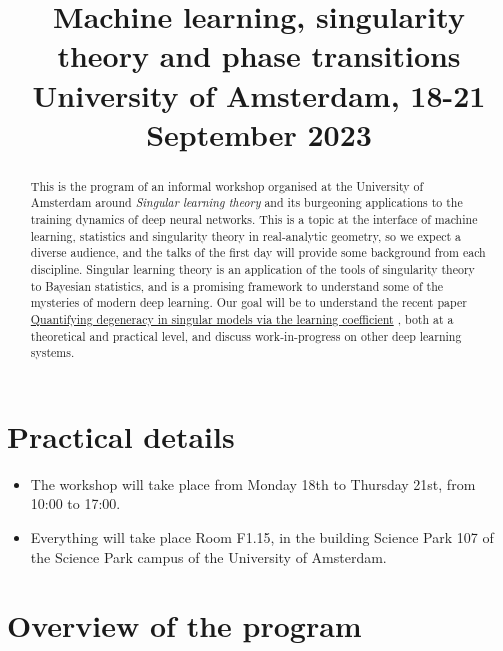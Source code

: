 \documentclass[a4paper,11pt]{amsart}
\title[Machine learning, singularity theory and phase transitions]{Machine learning, singularity theory and phase transitions \\ University of Amsterdam, 18-21 September 2023}
\begin{document}
\maketitle
\begin{abstract}
This is the program of an informal workshop organised at the University of Amsterdam around \emph{Singular learning theory} and its burgeoning applications to the training dynamics of deep neural networks. This is a topic at the interface of machine learning, statistics and singularity theory in real-analytic geometry, so we expect a diverse audience, and the talks of the first day will provide some background from each discipline. Singular learning theory is an application of the tools of singularity theory to Bayesian statistics, and is a promising framework to understand some of the mysteries of modern deep learning. Our goal will be to understand the recent paper \href{https://arxiv.org/abs/2308.12108}{Quantifying degeneracy in singular models via the learning coefficient} \cite{lambdahat}, both at a theoretical and practical level, and discuss work-in-progress on other deep learning systems.  
\end{abstract}

\section*{Practical details}

\begin{itemize}
\item The workshop will take place from Monday 18th to Thursday 21st, from 10:00 to 17:00.

\item Everything will take place Room F1.15, in the building Science Park 107 of the Science Park campus of the University of Amsterdam.


\end{itemize}

\section*{Overview of the program}
\end{document}
